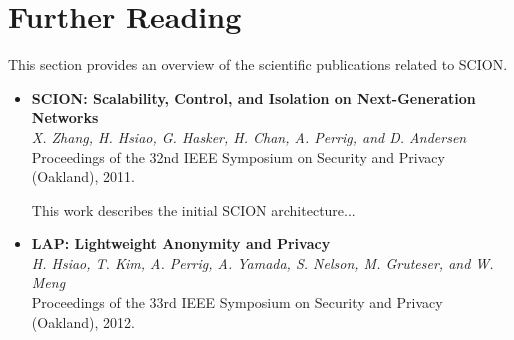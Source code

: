 \section{Further Reading}

This section provides an overview of the scientific publications related to SCION.

\begin{itemize}

\item[\cite{ZHHCPA2011}] \textbf{SCION: Scalability, Control, and Isolation on Next-Generation Networks}\\
\textit{X. Zhang, H. Hsiao, G. Hasker, H. Chan, A. Perrig, and D. Andersen} \\
{\footnotesize Proceedings of the 32nd IEEE Symposium on Security and Privacy (Oakland), 2011.}

This work describes the initial SCION architecture...


\item[\cite{HKPYNGM2012}] \textbf{LAP: Lightweight Anonymity and Privacy}\\
\textit{H. Hsiao, T. Kim, A. Perrig, A. Yamada, S. Nelson, M. Gruteser, and W. Meng} \\
{\footnotesize Proceedings of the 33rd IEEE Symposium on Security and Privacy (Oakland), 2012.}



\end{itemize}


